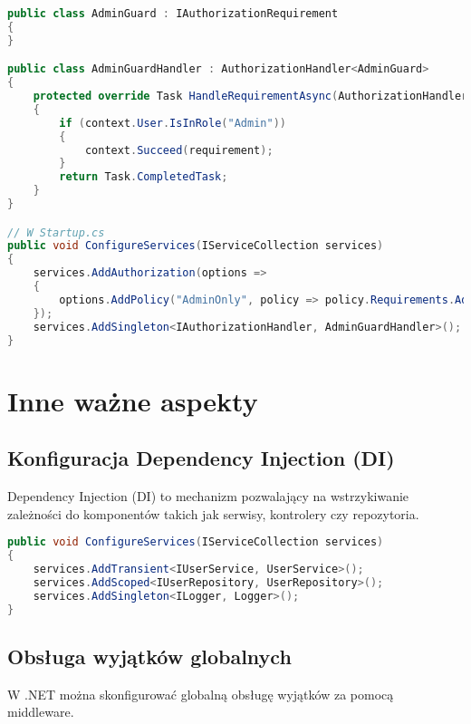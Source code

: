 \documentclass[a4paper,12pt]{article}
\begin{document}
\begin{lstlisting}[language=C#, caption=Przykład implementacji guardu]
public class AdminGuard : IAuthorizationRequirement
{
}

public class AdminGuardHandler : AuthorizationHandler<AdminGuard>
{
    protected override Task HandleRequirementAsync(AuthorizationHandlerContext context, AdminGuard requirement)
    {
        if (context.User.IsInRole("Admin"))
        {
            context.Succeed(requirement);
        }
        return Task.CompletedTask;
    }
}

// W Startup.cs
public void ConfigureServices(IServiceCollection services)
{
    services.AddAuthorization(options =>
    {
        options.AddPolicy("AdminOnly", policy => policy.Requirements.Add(new AdminGuard()));
    });
    services.AddSingleton<IAuthorizationHandler, AdminGuardHandler>();
}
\end{lstlisting}

\section{Inne ważne aspekty}

\subsection{Konfiguracja Dependency Injection (DI)}
Dependency Injection (DI) to mechanizm pozwalający na wstrzykiwanie zależności do komponentów takich jak serwisy, kontrolery czy repozytoria.

\begin{lstlisting}[language=C#, caption=Przykład konfiguracji DI w Startup.cs]
public void ConfigureServices(IServiceCollection services)
{
    services.AddTransient<IUserService, UserService>();
    services.AddScoped<IUserRepository, UserRepository>();
    services.AddSingleton<ILogger, Logger>();
}
\end{lstlisting}

\subsection{Obsługa wyjątków globalnych}
W .NET można skonfigurować globalną obsługę wyjątków za pomocą middleware.
\end{document}
